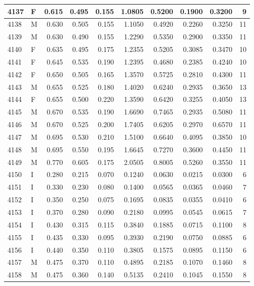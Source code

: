 \documentclass[9pt,twocolumn,twoside,]{pnas-new}
\begin{document}
\begin{tabular}{l|l|r|r|r|r|r|r|r|r}
\hline
4137 & F & 0.615 & 0.495 & 0.155 & 1.0805 & 0.5200 & 0.1900 & 0.3200 & 9\\
\hline
4138 & M & 0.630 & 0.505 & 0.155 & 1.1050 & 0.4920 & 0.2260 & 0.3250 & 11\\
\hline
4139 & M & 0.630 & 0.490 & 0.155 & 1.2290 & 0.5350 & 0.2900 & 0.3350 & 11\\
\hline
4140 & F & 0.635 & 0.495 & 0.175 & 1.2355 & 0.5205 & 0.3085 & 0.3470 & 10\\
\hline
4141 & F & 0.645 & 0.535 & 0.190 & 1.2395 & 0.4680 & 0.2385 & 0.4240 & 10\\
\hline
4142 & F & 0.650 & 0.505 & 0.165 & 1.3570 & 0.5725 & 0.2810 & 0.4300 & 11\\
\hline
4143 & M & 0.655 & 0.525 & 0.180 & 1.4020 & 0.6240 & 0.2935 & 0.3650 & 13\\
\hline
4144 & F & 0.655 & 0.500 & 0.220 & 1.3590 & 0.6420 & 0.3255 & 0.4050 & 13\\
\hline
4145 & M & 0.670 & 0.535 & 0.190 & 1.6690 & 0.7465 & 0.2935 & 0.5080 & 11\\
\hline
4146 & M & 0.670 & 0.525 & 0.200 & 1.7405 & 0.6205 & 0.2970 & 0.6570 & 11\\
\hline
4147 & M & 0.695 & 0.530 & 0.210 & 1.5100 & 0.6640 & 0.4095 & 0.3850 & 10\\
\hline
4148 & M & 0.695 & 0.550 & 0.195 & 1.6645 & 0.7270 & 0.3600 & 0.4450 & 11\\
\hline
4149 & M & 0.770 & 0.605 & 0.175 & 2.0505 & 0.8005 & 0.5260 & 0.3550 & 11\\
\hline
4150 & I & 0.280 & 0.215 & 0.070 & 0.1240 & 0.0630 & 0.0215 & 0.0300 & 6\\
\hline
4151 & I & 0.330 & 0.230 & 0.080 & 0.1400 & 0.0565 & 0.0365 & 0.0460 & 7\\
\hline
4152 & I & 0.350 & 0.250 & 0.075 & 0.1695 & 0.0835 & 0.0355 & 0.0410 & 6\\
\hline
4153 & I & 0.370 & 0.280 & 0.090 & 0.2180 & 0.0995 & 0.0545 & 0.0615 & 7\\
\hline
4154 & I & 0.430 & 0.315 & 0.115 & 0.3840 & 0.1885 & 0.0715 & 0.1100 & 8\\
\hline
4155 & I & 0.435 & 0.330 & 0.095 & 0.3930 & 0.2190 & 0.0750 & 0.0885 & 6\\
\hline
4156 & I & 0.440 & 0.350 & 0.110 & 0.3805 & 0.1575 & 0.0895 & 0.1150 & 6\\
\hline
4157 & M & 0.475 & 0.370 & 0.110 & 0.4895 & 0.2185 & 0.1070 & 0.1460 & 8\\
\hline
4158 & M & 0.475 & 0.360 & 0.140 & 0.5135 & 0.2410 & 0.1045 & 0.1550 & 8\\

\end{tabular}
\end{document}
